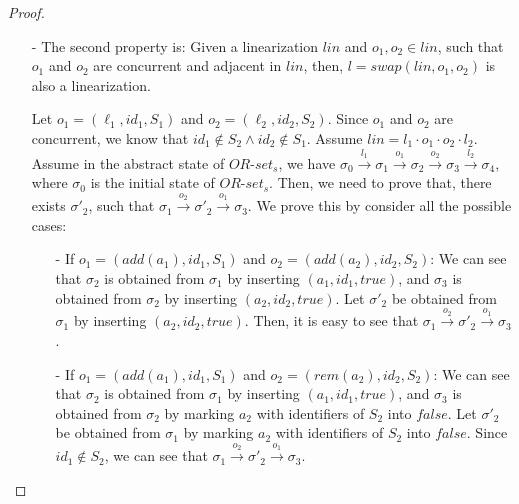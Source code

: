 {\begin {proof}
\begin{itemize}
    Since $o$ and $o'$ are adjacent and $(o,o') \in \mathit{diff}(\mathit{lin},\mathit{lin}')$, by assumption we know that $o$ and $o'$ are not concurrent. Or we can say, $(o,o') \in \mathit{vis} \vee \mathit{o',o} \in \mathit{vis}$. This contradicts that both $\mathit{lin}$ and $\mathit{lin}'$ are consistent with visibility relation. This completes the proof of the first step.

\item[-] The second property is: Given a linearization $\mathit{lin}$ and $o_1,o_2 \in \mathit{lin}$, such that $o_1$ and $o_2$ are concurrent and adjacent in $\mathit{lin}$, then, $l = \mathit{swap}(\mathit{lin},o_1,o_2)$ is also a linearization.

    Let $o_1 = (\ell_1,\mathit{id}_1,S_1)$ and $o_2 = (\ell_2,\mathit{id}_2,S_2)$. Since $o_1$ and $o_2$ are concurrent, we know that $\mathit{id}_1 \notin S_2 \wedge \mathit{id}_2 \notin S_1$. Assume $\mathit{lin} = l_1 \cdot o_1 \cdot o_2 \cdot l_2$. Assume in the abstract state of $\mathit{OR}$-$\mathit{set}_s$, we have $\sigma_0 {\xrightarrow{l_1}} \sigma_1 {\xrightarrow{o_1}} \sigma_2 {\xrightarrow{o_2}} \sigma_3 {\xrightarrow{l_2}} \sigma_4$, where $\sigma_0$ is the initial state of $\mathit{OR}$-$\mathit{set}_s$. Then, we need to prove that, there exists $\sigma'_2$, such that $\sigma_1 {\xrightarrow{o_2}} \sigma'_2 {\xrightarrow{o_1}} \sigma_3$. We prove this by consider all the possible cases:

    \begin{itemize}
    \setlength{\itemsep}{0.5pt}
    \item[-] If $o_1 = (\mathit{add}(a_1),\mathit{id}_1,S_1)$ and $o_2 = (\mathit{add}(a_2),\mathit{id}_2,S_2)$: We can see that $\sigma_2$ is obtained from $\sigma_1$ by inserting $(a_1,\mathit{id}_1,\mathit{true})$, and $\sigma_3$ is obtained from $\sigma_2$ by inserting $(a_2,\mathit{id}_2,\mathit{true})$. Let $\sigma'_2$ be obtained from $\sigma_1$ by inserting $(a_2,\mathit{id}_2,\mathit{true})$. Then, it is easy to see that $\sigma_1 {\xrightarrow{o_2}} \sigma'_2 {\xrightarrow{o_1}} \sigma_3$.

    \item[-] If $o_1 = (\mathit{add}(a_1),\mathit{id}_1,S_1)$ and $o_2 = (\mathit{rem}(a_2),\mathit{id}_2,S_2)$: We can see that $\sigma_2$ is obtained from $\sigma_1$ by inserting $(a_1,\mathit{id}_1,\mathit{true})$, and $\sigma_3$ is obtained from $\sigma_2$ by marking $a_2$ with identifiers of $S_2$ into $\mathit{false}$. Let $\sigma'_2$ be obtained from $\sigma_1$ by marking $a_2$ with identifiers of $S_2$ into $\mathit{false}$. Since $\mathit{id_1} \notin S_2$, we can see that $\sigma_1 {\xrightarrow{o_2}} \sigma'_2 {\xrightarrow{o_1}} \sigma_3$.


\end{itemize}
\end{itemize}
\end{proof}}
